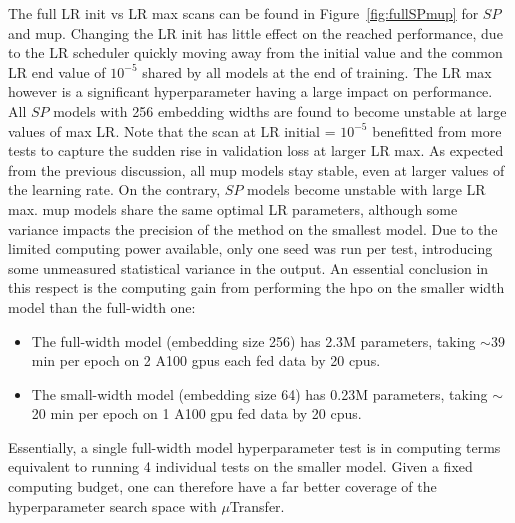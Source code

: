 The full LR init vs LR max scans can be found in Figure~\ref{fig:fullSPmup} for $SP$ and \gls{mup}. Changing the LR init has little effect on the reached performance, due to the LR scheduler quickly moving away from the initial value and the common LR end value of $10^{-5}$ shared by all models at the end of training. The LR max however is a significant hyperparameter having a large impact on performance. All $SP$ models with 256 embedding widths are found to become unstable at large values of max LR. Note that the scan at LR initial = $10^{-5}$ benefitted from more tests to capture the sudden rise in validation loss at larger LR max. As expected from the previous discussion, all \gls{mup} models stay stable, even at larger values of the learning rate. On the contrary, $SP$ models become unstable with large LR max. \gls{mup} models share the same optimal LR parameters, although some variance impacts the precision of the method on the smallest model. Due to the limited computing power available, only one seed was run per test, introducing some unmeasured statistical variance in the output. An essential conclusion in this respect is the computing gain from performing the \gls{hpo} on the smaller width model than the full-width one:
\begin{itemize}
  \item The full-width model (embedding size 256) has 2.3M parameters, taking $\sim$39 min per epoch on 2 A100 \gls{gpu}s each fed data by 20 \gls{cpu}s.
  \item The small-width model (embedding size 64) has 0.23M parameters, taking $\sim$20 min per epoch on 1 A100 \gls{gpu} fed data by 20 \gls{cpu}s.
\end{itemize}
Essentially, a single full-width model hyperparameter test is in computing terms equivalent to running 4 individual tests on the smaller model. Given a fixed computing budget, one can therefore have a far better coverage of the hyperparameter search space with $\mu$Transfer.\\

